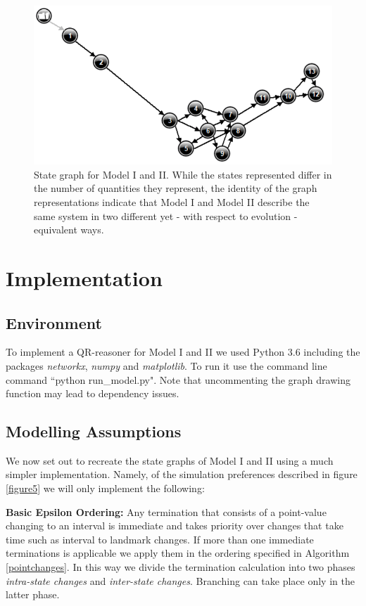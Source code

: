 \documentclass{article}
\begin{document}
\begin{figure}
	\centering
	\includegraphics[scale=0.9]{Simple_State_Graph.png}
	\caption{State graph for Model I and II. While the states represented differ in the number of quantities they represent, the identity of the graph representations indicate that Model I and Model II describe the same system in two different yet - with respect to evolution - equivalent ways.}
	\label{figure7}
\end{figure}

\section{Implementation}

\subsection{Environment}

To implement a QR-reasoner for Model I and II we used Python 3.6 including the packages \textit{networkx}, \textit{numpy} and \textit{matplotlib}. To run it use the command line command ``python run\_model.py". Note that uncommenting the graph drawing function may lead to dependency issues. 

\subsection{Modelling Assumptions}

We now set out to recreate the state graphs of Model I and II using a much simpler implementation. Namely, of the simulation preferences described in figure \ref{figure5} we will only implement the following:


\textbf{Basic Epsilon Ordering:} Any termination that consists of a point-value changing to an interval is immediate and takes priority over changes that take time such as interval to landmark changes. If more than one immediate terminations is applicable we apply them in the ordering specified in Algorithm \ref{pointchanges}. In this way we divide the termination calculation into two phases \textit{intra-state changes} and \textit{inter-state changes}. Branching can take place only in the latter phase.
\end{document}

